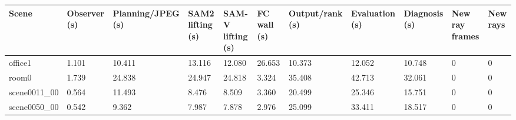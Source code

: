 \begin{tabular}{lllllllllll}
\toprule
Scene & Observer (s) & Planning/JPEG (s) & SAM2 lifting (s) & SAM-V lifting (s) & FC wall (s) & Output/rank (s) & Evaluation (s) & Diagnosis (s) & New ray frames & New rays \\
\midrule
office1 & 1.101 & 10.411 & 13.116 & 12.080 & 26.653 & 10.373 & 12.052 & 10.748 & 0 & 0 \\
room0 & 1.739 & 24.838 & 24.947 & 24.818 & 3.324 & 35.408 & 42.713 & 32.061 & 0 & 0 \\
scene0011\_00 & 0.564 & 11.493 & 8.476 & 8.509 & 3.360 & 20.499 & 25.346 & 15.751 & 0 & 0 \\
scene0050\_00 & 0.542 & 9.362 & 7.987 & 7.878 & 2.976 & 25.099 & 33.411 & 18.517 & 0 & 0 \\
\bottomrule
\end{tabular}
